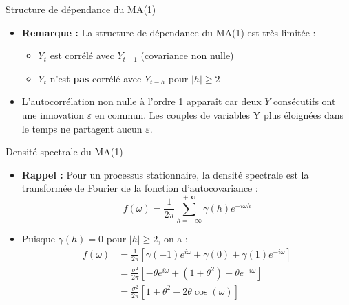 \documentclass[11pt,aspectratio=169]{beamer}
\begin{document}
\begin{frame}{Structure de dépendance du MA(1)}

\begin{itemize}

\item \textbf{Remarque :}
La structure de dépendance du MA(1) est très limitée :
\begin{itemize}
\item $Y_t$ est corrélé avec $Y_{t-1}$ (covariance non nulle)
\item $Y_t$ n'est \textbf{pas} corrélé avec $Y_{t-h}$ pour $|h| \geq 2$
\end{itemize}

\item L'autocorrélation non nulle à l'ordre 1 apparaît car deux $Y$ consécutifs ont une innovation $\varepsilon$ en commun. Les couples de variables Y plus éloignées dans le temps ne partagent aucun $\varepsilon$.

\end{itemize}
\end{frame}

\begin{frame}{Densité spectrale du MA(1)}

\begin{itemize}

\item \textbf{Rappel :} Pour un processus stationnaire, la densité spectrale est la transformée de Fourier de la fonction d'autocovariance :
\[
f(\omega) = \frac{1}{2\pi} \sum_{h=-\infty}^{+\infty} \gamma(h) e^{-i\omega h}
\]

\item Puisque $\gamma(h) = 0$ pour $|h| \geq 2$, on a :
\begin{align*}
f(\omega) &= \frac{1}{2\pi} \left[ \gamma(-1) e^{i\omega} + \gamma(0) + \gamma(1) e^{-i\omega} \right] \\
&= \frac{\sigma^2}{2\pi} \left[ -\theta e^{i\omega} + (1+\theta^2) - \theta e^{-i\omega} \right] \\
&= \frac{\sigma^2}{2\pi} \left[ 1 + \theta^2 - 2\theta \cos(\omega) \right]
\end{align*}

\end{itemize}
\end{frame}
\end{document}
